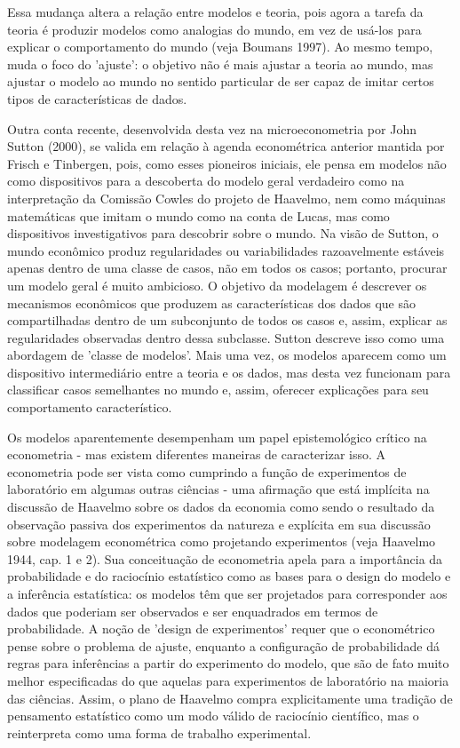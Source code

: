 \documentclass[12pt]{article}
\begin{document}
Essa mudança altera a relação entre modelos e teoria, pois agora a tarefa da teoria é produzir modelos como analogias do mundo, em vez de usá-los para explicar o comportamento do mundo (veja Boumans 1997). Ao mesmo tempo, muda o foco do 'ajuste': o objetivo não é mais ajustar a teoria ao mundo, mas ajustar o modelo ao mundo no sentido particular de ser capaz de imitar certos tipos de características de dados.

Outra conta recente, desenvolvida desta vez na microeconometria por John Sutton (2000), se valida em relação à agenda econométrica anterior mantida por Frisch e Tinbergen, pois, como esses pioneiros iniciais, ele pensa em modelos não como dispositivos para a descoberta do modelo geral verdadeiro como na interpretação da Comissão Cowles do projeto de Haavelmo, nem como máquinas matemáticas que imitam o mundo como na conta de Lucas, mas como dispositivos investigativos para descobrir sobre o mundo. Na visão de Sutton, o mundo econômico produz regularidades ou variabilidades razoavelmente estáveis apenas dentro de uma classe de casos, não em todos os casos; portanto, procurar um modelo geral é muito ambicioso. O objetivo da modelagem é descrever os mecanismos econômicos que produzem as características dos dados que são compartilhadas dentro de um subconjunto de todos os casos e, assim, explicar as regularidades observadas dentro dessa subclasse. Sutton descreve isso como uma abordagem de 'classe de modelos'. Mais uma vez, os modelos aparecem como um dispositivo intermediário entre a teoria e os dados, mas desta vez funcionam para classificar casos semelhantes no mundo e, assim, oferecer explicações para seu comportamento característico.

Os modelos aparentemente desempenham um papel epistemológico crítico na econometria - mas existem diferentes maneiras de caracterizar isso. A econometria pode ser vista como cumprindo a função de experimentos de laboratório em algumas outras ciências - uma afirmação que está implícita na discussão de Haavelmo sobre os dados da economia como sendo o resultado da observação passiva dos experimentos da natureza e explícita em sua discussão sobre modelagem econométrica como projetando experimentos (veja Haavelmo 1944, cap. 1 e 2). Sua conceituação de econometria apela para a importância da probabilidade e do raciocínio estatístico como as bases para o design do modelo e a inferência estatística: os modelos têm que ser projetados para corresponder aos dados que poderiam ser observados e ser enquadrados em termos de probabilidade. A noção de 'design de experimentos' requer que o econométrico pense sobre o problema de ajuste, enquanto a configuração de probabilidade dá regras para inferências a partir do experimento do modelo, que são de fato muito melhor especificadas do que aquelas para experimentos de laboratório na maioria das ciências. Assim, o plano de Haavelmo compra explicitamente uma tradição de pensamento estatístico como um modo válido de raciocínio científico, mas o reinterpreta como uma forma de trabalho experimental.
\end{document}
